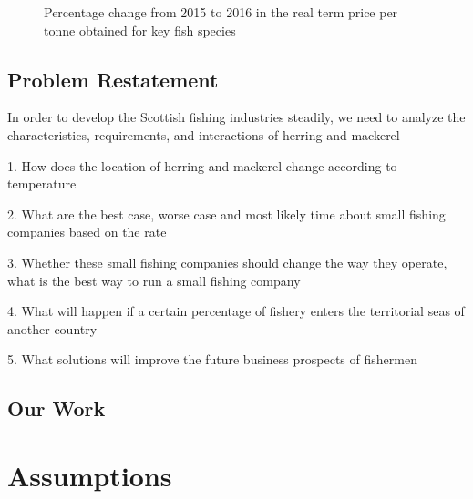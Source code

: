 \documentclass{mcmthesis}
\begin{document}
\begin{figure}[tbp]
  \caption{ Percentage change from 2015 to 2016 in the real term price per tonne obtained for key fish species}\label{figure3}
\end{figure}

\subsection{Problem Restatement}
In order to develop the Scottish fishing industries steadily,   we need to analyze the characteristics, requirements, and interactions of herring and mackerel

1.    How does the location of herring and mackerel change according to temperature

2.    What are the best case, worse case and most likely time about  small fishing companies  based on the rate 


3.    Whether these small fishing companies should change the way they operate, what is the best way to run a small fishing company
 
4.    What will happen if a certain percentage of fishery enters the territorial seas of another country

5.    What solutions will improve the future business prospects of fishermen



\subsection{Our Work}


\section{Assumptions}
\end{document}
